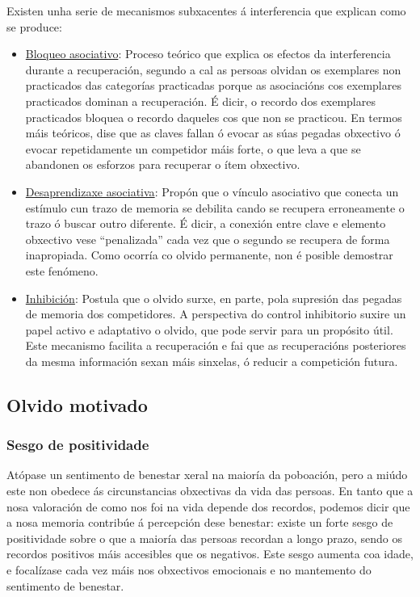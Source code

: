 \documentclass[a4paper,11pt]{article}
\begin{document}
\begin{itemize}
	Existen unha serie de mecanismos subxacentes á interferencia que explican como se produce:
	\begin{itemize}
		\item \underline{Bloqueo asociativo}: Proceso teórico que explica os efectos da 
		interferencia durante a recuperación, segundo a cal as persoas olvidan os exemplares non 
		practicados das categorías practicadas porque as asociacións cos exemplares practicados 
		dominan a recuperación. É dicir, o recordo dos exemplares practicados bloquea o recordo 
		daqueles cos que non se practicou. En termos máis teóricos, dise que as claves fallan ó 
		evocar as súas pegadas obxectivo ó evocar repetidamente un competidor máis forte, o que leva 
		a que se abandonen os esforzos para recuperar o ítem obxectivo.
		\item \underline{Desaprendizaxe asociativa}: Propón que o vínculo asociativo que conecta un 
		estímulo cun trazo de memoria se debilita cando se recupera erroneamente o trazo ó buscar 
		outro diferente. É dicir, a conexión entre clave e elemento obxectivo vese ``penalizada'' 
		cada vez que o segundo se recupera de forma inapropiada. Como ocorría co olvido permanente, 
		non é posible demostrar este fenómeno.
		\item \underline{Inhibición}: Postula que o olvido surxe, en parte, pola supresión das 
		pegadas de memoria dos competidores. A perspectiva do control inhibitorio suxire un papel 
		activo e adaptativo o olvido, que pode servir para un propósito útil. Este mecanismo
		facilita a recuperación e fai que as recuperacións posteriores da mesma información sexan 
		máis sinxelas, ó reducir a competición futura.
	\end{itemize}
\end{itemize}

\subsection{Olvido motivado}
\subsubsection{Sesgo de positividade}
Atópase un sentimento de benestar xeral na maioría da poboación, pero a miúdo este non obedece ás circunstancias obxectivas da vida das persoas. En tanto que a nosa valoración de como nos foi na vida depende dos recordos, podemos dicir que a nosa memoria contribúe á percepción dese benestar: existe un forte sesgo de positividade sobre o que a maioría das persoas recordan a longo prazo, sendo os recordos positivos máis accesibles que os negativos. Este sesgo aumenta coa idade, e focalízase cada vez máis nos obxectivos emocionais e no mantemento do sentimento de benestar.
\end{document}

